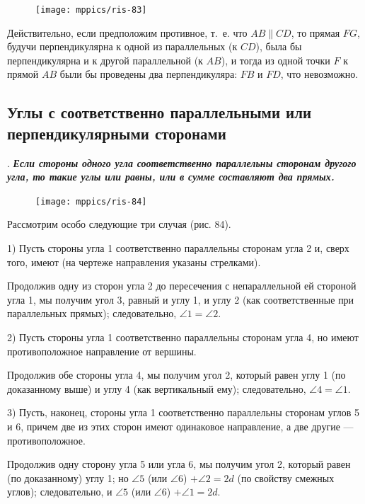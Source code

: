 \documentclass[oneside]{book}
\begin{document}
\begin{figure}
\centering
\texttt{[image: mppics/ris-83]}
\caption{}
\end{figure}

Действительно, если предположим противное, т.~е.
что $AB \parallel CD$, то прямая $FG$, будучи перпендикулярна к одной из параллельных (к $CD$), была бы перпендикулярна и к другой параллельной (к $AB$), и тогда из одной точки $F$ к прямой $AB$ были бы проведены два перпендикуляра:
$FB$ и $FD$, что невозможно.

\subsection*{Углы с соответственно параллельными или перпендикулярными сторонами}

.
\textbf{\emph{Если стороны одного угла соответственно параллельны сторонам другого угла, то такие углы или равны, или в сумме составляют два прямых.}}

\begin{figure}
\centering
\texttt{[image: mppics/ris-84]}
\caption{}
\end{figure}

Рассмотрим особо следующие три случая (рис. 84).

1) Пусть стороны угла 1 соответственно параллельны сторонам угла 2 и, сверх того, имеют  (на чертеже направления указаны стрелками).

Продолжив одну из сторон угла 2 до пересечения с непараллельной ей стороной угла 1, мы получим угол 3, равный и углу 1, и углу 2 (как соответственные при параллельных прямых);
следовательно, $\angle 1 = \angle 2$.

2) Пусть стороны угла 1 соответственно параллельны сторонам угла 4, но имеют противоположное направление от вершины.

Продолжив обе стороны угла 4, мы получим угол 2, который равен углу 1 (по доказанному выше) и углу 4 (как вертикальный ему);
следовательно, $\angle 4 = \angle 1$.

3) Пусть, наконец, стороны угла 1 соответственно параллельны сторонам углов 5 и 6, причем две из этих сторон имеют одинаковое направление, а две другие — противоположное.

Продолжив одну сторону угла 5 или угла 6, мы получим угол 2, который равен (по доказанному) углу 1;
но $\angle 5$ (или $\angle 6$) $+\angle 2 = 2d$ (по свойству смежных углов);
следовательно, и $\angle 5$ (или $\angle 6$) $+ \angle 1 = 2d$.
\end{document}
